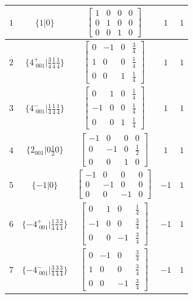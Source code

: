 \documentclass[fleqn,8pt]{jsarticle}
\begin{document}
\begin{longtable}{ccccc}
$ 1 $ & $ \{1|0\} $ & $ \begin{bmatrix} 1 & 0 & 0 & 0 \\ 0 & 1 & 0 & 0 \\ 0 & 0 & 1 & 0 \end{bmatrix} $ & $ 1 $ & $ 1 $ \\ \hline
$ 2 $ & $ \{4^{+}_{\,\,001}|\frac{3}{4} \frac{1}{4} \frac{1}{4}\} $ & $ \begin{bmatrix} 0 & -1 & 0 & \frac{3}{4} \\ 1 & 0 & 0 & \frac{1}{4} \\ 0 & 0 & 1 & \frac{1}{4} \end{bmatrix} $ & $ 1 $ & $ 1 $ \\ \hline
$ 3 $ & $ \{4^{-}_{\,\,001}|\frac{1}{4} \frac{1}{4} \frac{1}{4}\} $ & $ \begin{bmatrix} 0 & 1 & 0 & \frac{1}{4} \\ -1 & 0 & 0 & \frac{1}{4} \\ 0 & 0 & 1 & \frac{1}{4} \end{bmatrix} $ & $ 1 $ & $ 1 $ \\ \hline
$ 4 $ & $ \{2{}_{001}|0 \frac{1}{2} 0\} $ & $ \begin{bmatrix} -1 & 0 & 0 & 0 \\ 0 & -1 & 0 & \frac{1}{2} \\ 0 & 0 & 1 & 0 \end{bmatrix} $ & $ 1 $ & $ 1 $ \\ \hline
$ 5 $ & $ \{-1|0\} $ & $ \begin{bmatrix} -1 & 0 & 0 & 0 \\ 0 & -1 & 0 & 0 \\ 0 & 0 & -1 & 0 \end{bmatrix} $ & $ -1 $ & $ 1 $ \\ \hline
$ 6 $ & $ \{-4^{+}_{\,\,001}|\frac{1}{4} \frac{3}{4} \frac{3}{4}\} $ & $ \begin{bmatrix} 0 & 1 & 0 & \frac{1}{4} \\ -1 & 0 & 0 & \frac{3}{4} \\ 0 & 0 & -1 & \frac{3}{4} \end{bmatrix} $ & $ -1 $ & $ 1 $ \\ \hline
$ 7 $ & $ \{-4^{-}_{\,\,001}|\frac{3}{4} \frac{3}{4} \frac{3}{4}\} $ & $ \begin{bmatrix} 0 & -1 & 0 & \frac{3}{4} \\ 1 & 0 & 0 & \frac{3}{4} \\ 0 & 0 & -1 & \frac{3}{4} \end{bmatrix} $ & $ -1 $ & $ 1 $ \\ \hline

\end{longtable}
\end{document}
